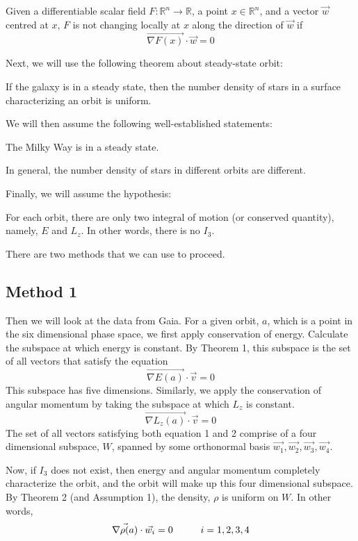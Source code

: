 \documentclass[12pt]{article}
\begin{document}
\begin{theorem}
Given a differentiable scalar field $F: \mathbb{R}^n \to \mathbb{R}$, a point  $x \in \mathbb{R}^n$, and a vector $\vec{w}$ centred at $x$, $F$ is not changing locally at $x$ along the direction of $\vec{w}$ if 
$$ \vec{\nabla F(x)} \cdot \vec{w} = 0$$
\end{theorem}
Next, we will use the following theorem about steady-state orbit:
\begin{theorem}
If the galaxy is in a steady state, then the number density of stars in a surface characterizing an orbit is uniform.
\end{theorem}
We will then assume the following well-established statements:
\begin{assumption}
The Milky Way is in a steady state.
\end{assumption}
\begin{assumption}
In general, the number density of stars in different orbits are different.
\end{assumption}
Finally, we will assume the hypothesis:
\begin{hypothesis}
For each orbit, there are only two integral of motion (or conserved quantity), namely, $E$ and $L_z$. In other words, there is no $I_3$.
\end{hypothesis}

There are two methods that we can use to proceed.
\subsection*{Method 1}
Then we will look at the data from Gaia. For a given orbit, $a$, which is a point in the six dimensional phase space, we first apply conservation of energy. Calculate the subspace at which energy is constant. By Theorem 1, this subspace is the set of all vectors that satisfy the equation
\begin{equation}
\vec{\nabla E(a)} \cdot \vec{v} = 0
\end{equation}  
This subspace has five dimensions. Similarly, we apply the conservation of angular momentum by taking the subspace at which $L_z$ is constant.
\begin{equation} 
\vec{\nabla L_z(a)} \cdot \vec{v} = 0 
\end{equation}
The set of all vectors satisfying both equation 1 and 2 comprise of a four dimensional subspace, $W$, spanned by some orthonormal basis $\vec{w_1},\vec{w_2},\vec{w_3},\vec{w_4} $.

Now, if $I_3$ does not exist, then energy and angular momentum completely characterize the orbit, and the orbit will make up this four dimensional subspace. By Theorem 2 (and Assumption 1), the density, $\rho$ is uniform on $W$. In other words,
\begin{equation}
\vec{\nabla \rho(a)} \cdot \vec{w_i} = 0 \hspace{1 cm} i = 1, 2, 3, 4 
\end{equation}
\end{document}
